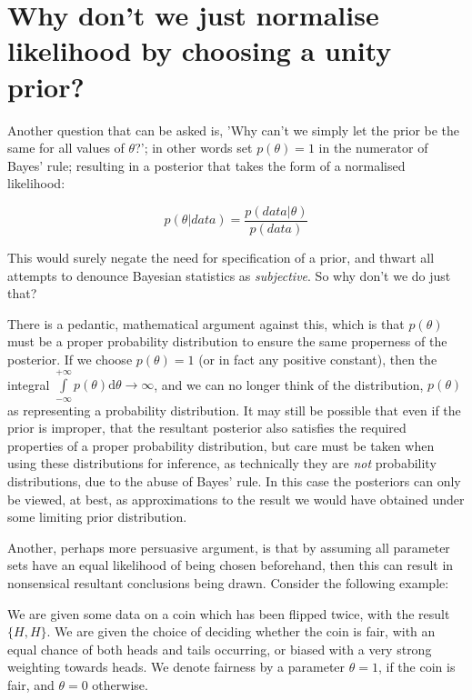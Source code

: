 \documentclass[11pt,fullpage]{book}
\begin{document}
\section{Why don't we just normalise likelihood by choosing a unity prior?}\label{sec:Prior_unityPrior}
Another question that can be asked is, 'Why can't we simply let the prior be the same for all values of $\theta$?'; in other words set $p(\theta) = 1$ in the numerator of Bayes' rule; resulting in a posterior that takes the form of a normalised likelihood:

\begin{equation}
p(\theta|data) = \frac{p(data|\theta)} {p(data)}
\end{equation}\label{eq:Prior_BayesNormalisedLikelihood}


This would surely negate the need for specification of a prior, and thwart all attempts to denounce Bayesian statistics as \textit{subjective}. So why don't we do just that? 

There is a pedantic, mathematical argument against this, which is that $p(\theta)$ must be a proper probability distribution to ensure the same properness of the posterior. If we choose $p(\theta) = 1$ (or in fact any positive constant), then the integral $\int\limits_{-\infty}^{+\infty}p(\theta)\mathrm{d}\theta\rightarrow\infty$, and we can no longer think of the distribution, $p(\theta)$ as representing a probability distribution. It may still be possible that even if the prior is improper, that the resultant posterior also satisfies the required properties of a proper probability distribution, but care must be taken when using these distributions for inference, as technically they are \textit{not} probability distributions, due to the abuse of Bayes' rule. In this case the posteriors can only be viewed, at best, as approximations to the result we would have obtained under some limiting prior distribution.

Another, perhaps more persuasive argument, is that by assuming all parameter sets have an equal likelihood of being chosen beforehand, then this can result in nonsensical resultant conclusions being drawn. Consider the following example: 

We are given some data on a coin which has been flipped twice, with the result $\{H,H\}$. We are given the choice of deciding whether the  coin is fair, with an equal chance of both heads and tails occurring, or biased with a very strong weighting towards heads. We denote fairness by a parameter $\theta=1$, if the coin is fair, and $\theta=0$ otherwise.
\end{document}
